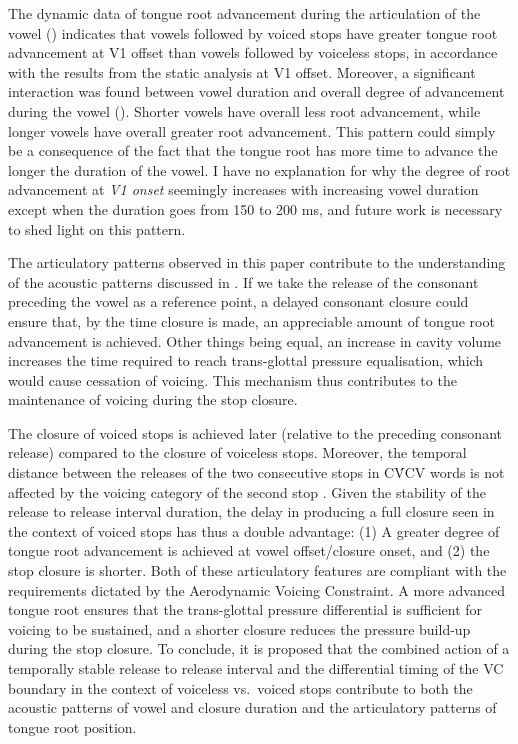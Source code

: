 \documentclass[preprint]{JASAnew}
\begin{document}
The dynamic data of tongue root advancement during the articulation of
the vowel () indicates that vowels followed by voiced
stops have greater tongue root advancement at V1 offset than vowels
followed by voiceless stops, in accordance with the results from the
static analysis at V1 offset. Moreover, a significant interaction was
found between vowel duration and overall degree of advancement during
the vowel (). Shorter vowels have overall less root
advancement, while longer vowels have overall greater root advancement.
This pattern could simply be a consequence of the fact that the tongue
root has more time to advance the longer the duration of the vowel. I
have no explanation for why the degree of root advancement at \emph{V1
onset} seemingly increases with increasing vowel duration except when
the duration goes from 150 to 200 ms, and future work is necessary to
shed light on this pattern.

The articulatory patterns observed in this paper contribute to the
understanding of the acoustic patterns discussed in . If
we take the release of the consonant preceding the vowel as a reference
point, a delayed consonant closure could ensure that, by the time
closure is made, an appreciable amount of tongue root advancement is
achieved. Other things being equal, an increase in cavity volume
increases the time required to reach trans-glottal pressure
equalisation, which would cause cessation of voicing. This mechanism
thus contributes to the maintenance of voicing during the stop closure.

The closure of voiced stops is achieved later (relative to the preceding
consonant release) compared to the closure of voiceless stops. Moreover,
the temporal distance between the releases of the two consecutive stops
in CV́CV words is not affected by the voicing category of the second stop
\citep{coretta2019k}. Given the stability of the release to release
interval duration, the delay in producing a full closure seen in the
context of voiced stops has thus a double advantage: (1) A greater
degree of tongue root advancement is achieved at vowel offset/closure
onset, and (2) the stop closure is shorter. Both of these articulatory
features are compliant with the requirements dictated by the Aerodynamic
Voicing Constraint. A more advanced tongue root ensures that the
trans-glottal pressure differential is sufficient for voicing to be
sustained, and a shorter closure reduces the pressure build-up during
the stop closure. To conclude, it is proposed that the combined action
of a temporally stable release to release interval and the differential
timing of the VC boundary in the context of voiceless vs.~voiced stops
contribute to both the acoustic patterns of vowel and closure duration
and the articulatory patterns of tongue root position.
\end{document}
